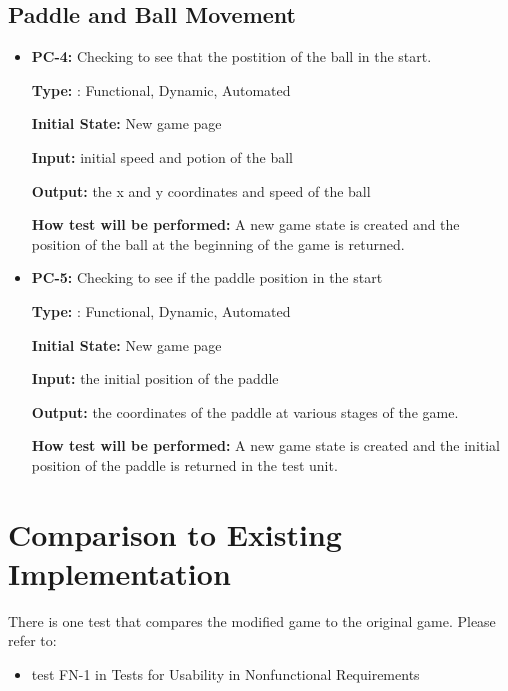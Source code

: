 \documentclass[12pt,letterpaper]{article}
\begin{document}
	\subsection{Paddle and Ball Movement}
\begin{reqbox}
	\begin{itemize}
	\item \textbf{PC-4: }Checking to see that the postition of the ball in the start.

	\textbf{Type: }: Functional, Dynamic, Automated

	\textbf{Initial State: } New game page

	\textbf{Input: } initial speed and potion of the ball

	\textbf{Output: }the x and y coordinates and speed of the ball

	\textbf{How test will be performed: }A new game state is created and the position of the ball at the beginning of the game is returned.
	\end{itemize}
\end{reqbox}

\begin{reqbox}
	\begin{itemize}
	\item \textbf{PC-5: }Checking to see if the paddle position in the start

	\textbf{Type: }: Functional, Dynamic, Automated
	
	\textbf{Initial State: } New game page

	\textbf{Input: } the initial position of the paddle

	\textbf{Output: }the coordinates of the paddle at various stages of the game.

	\textbf{How test will be performed: }A new game state is created and the initial position of the paddle is returned in the test unit. 
	\end{itemize}
\end{reqbox}


	\section{Comparison to Existing Implementation}
	 There is one test that compares the modified game to the original game. Please refer to:
	\begin{itemize}
	\item test FN-1 in Tests for Usability in Nonfunctional Requirements
	\end{itemize}
\end{document}
